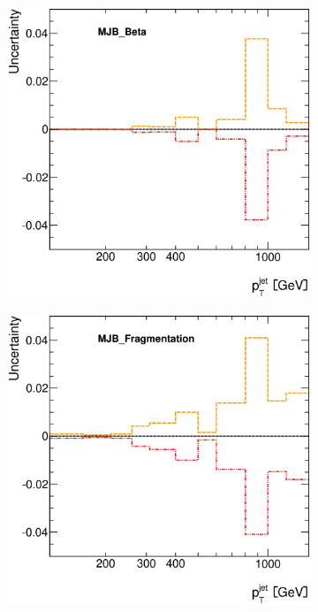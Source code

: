 \documentclass[12pt, twoside]{article}
\numberwithin{equation}{section}
\numberwithin{figure}{section}
\newenvironment{changemargin}[2]{%
\begin{list}{}{%
\setlength{\topsep}{0pt}%
\setlength{\leftmargin}{#1}%
\setlength{\rightmargin}{#2}%
\setlength{\listparindent}{\parindent}%
\setlength{\itemindent}{\parindent}%
\setlength{\parsep}{\parskip}%
}%
\item[]}{\end{list}}
\begin{document}
\begin{figure}[H]
\begin{changemargin}{-1.0cm}{-0.75cm}
\begin{changemargin}{-0.75cm}{-1.0cm}
        \begin{subfigure}[b]{0.25\textwidth}
            \includegraphics[width=\textwidth]{./images/JetSystematics/JetSystematic-25.eps}
        \end{subfigure}
        \begin{subfigure}[b]{0.25\textwidth}
            \includegraphics[width=\textwidth]{./images/JetSystematics/JetSystematic-26.eps}

\end{subfigure}
\end{changemargin}
\end{changemargin}
\end{figure}
\end{document}
